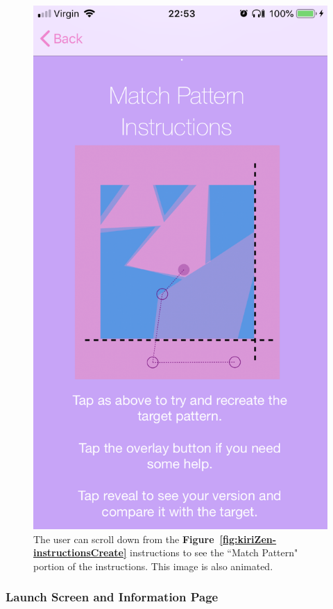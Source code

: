 \documentclass[11pt]{article}
\begin{document}
\begin{figure}[!ht]
\begin{minipage}{0.45\textwidth}
                                    \includegraphics[width=0.7\linewidth]{KiriZen/instructionsMatch}
                                    \caption{The user can scroll down from the  \textbf{Figure~\ref{fig:kiriZen-instructionsCreate}} instructions to see the ``Match Pattern" portion of the instructions. This image is also animated.}
                                    \label{fig:kiriZen-instructionsMatch}
                                \end{minipage}
                            \end{figure}


                 \subsubsection{Launch Screen and Information Page}
\end{document}
